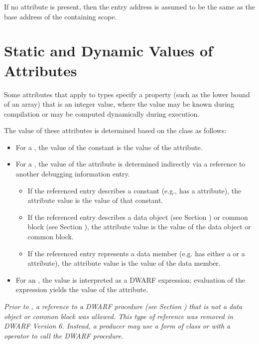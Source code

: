 If no \DWATentrypcNAME{} attribute is present,
then the entry address is assumed to be the same as the
base address of the containing scope.


\section{Static and Dynamic Values of Attributes}
\label{chap:staticanddynamicvaluesofattributes}

Some attributes that apply to types specify a property (such
as the lower bound of an array) that is an integer value,
where the value may be known during compilation or may be
computed dynamically during execution.

The value of these
attributes is determined based on the class as follows:
\begin{itemize}
\item For a , the value 
of the constant is the value of the attribute.

\item For a , the value 
\bb
of the attribute is determined indirectly via
\eb
a reference to another debugging information entry.
\db
\begin{itemize}
\renewcommand{\itemsep}{0cm}
\bb
\item If the referenced entry describes a constant (e.g., has a 
\DWATconstvalue{} attribute), the attribute value is the value 
of that constant.

\item If the referenced entry describes a data object 
(see Section ) or common block 
(see Section ), the attribute 
value is the value of the data object or common block.

\item If the referenced entry represents a data member (e.g. has either a 
\DWATdatamemberlocation{} or a \DWATdatabitoffset{} attribute), the 
attribute value is the value of the data member.
\eb
\end{itemize}

\item For an 
\bb
\CLASSexprval,
\eb
the value is interpreted as a DWARF expression; evaluation of 
the expression yields the value of the attribute.
\end{itemize}

\bb
\textit{Prior to \DWARFVersionVI, a reference to a DWARF procedure 
(see Section ) 
that is not a data object or common block was allowed. This type of 
reference was removed in DWARF Version 6. Instead, a producer may use a form 
of class \CLASSexprval{} or \CLASSlocdesc{} with a \DWOPcallref{} 
operator to call the DWARF procedure.}
\eb

